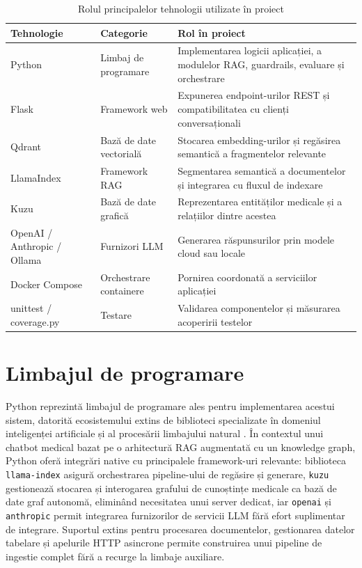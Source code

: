 \documentclass[12pt, a4paper, oneside, romanian]{teza-upb}
\begin{document}
\begin{table}[h]
\centering
\caption{Rolul principalelor tehnologii utilizate în proiect}
\begin{tabular}{|p{3cm}|p{4cm}|p{6cm}|}
\hline
\textbf{Tehnologie} & \textbf{Categorie} & \textbf{Rol în proiect} \\
\hline
Python & Limbaj de programare & Implementarea logicii aplicației, a modulelor RAG, guardrails, evaluare și orchestrare \\
\hline
Flask & Framework web & Expunerea endpoint-urilor REST și compatibilitatea cu clienți conversaționali \\
\hline
Qdrant & Bază de date vectorială & Stocarea embedding-urilor și regăsirea semantică a fragmentelor relevante \\
\hline
LlamaIndex & Framework RAG & Segmentarea semantică a documentelor și integrarea cu fluxul de indexare \\
\hline
Kuzu & Bază de date grafică & Reprezentarea entităților medicale și a relațiilor dintre acestea \\
\hline
OpenAI / Anthropic / Ollama & Furnizori LLM & Generarea răspunsurilor prin modele cloud sau locale \\
\hline
Docker Compose & Orchestrare containere & Pornirea coordonată a serviciilor aplicației \\
\hline
unittest / coverage.py & Testare & Validarea componentelor și măsurarea acoperirii testelor \\
\hline
\end{tabular}
\end{table}

\section{Limbajul de programare}

Python reprezintă limbajul de programare ales pentru implementarea acestui sistem,
datorită ecosistemului extins de biblioteci specializate în domeniul inteligenței
artificiale și al procesării limbajului natural \cite{srinath2017python, llm_review_2024}. În contextul unui
chatbot medical bazat pe o arhitectură RAG augmentată cu un knowledge graph,
Python oferă integrări native cu principalele framework-uri relevante: biblioteca
\texttt{llama-index} asigură orchestrarea pipeline-ului de regăsire și generare,
\texttt{kuzu} gestionează stocarea și interogarea grafului de cunoștințe medicale
ca bază de date graf autonomă, eliminând necesitatea unui server dedicat, iar
\texttt{openai} și \texttt{anthropic} permit integrarea furnizorilor de servicii
LLM fără efort suplimentar de integrare. Suportul extins pentru procesarea
documentelor, gestionarea datelor tabelare și apelurile HTTP asincrone permite
construirea unui pipeline de ingestie complet fără a recurge la limbaje auxiliare.
\end{document}

